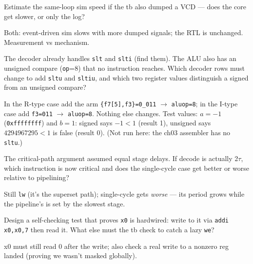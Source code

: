 \begin{exercise}[medium]\label{ex:m05e}
Estimate the same-loop sim speed if the tb also dumped a VCD ---
does the core get slower, or only the log?
\end{exercise}
\begin{solution}[hint]
Both: event-driven sim slows with more dumped signals; the RTL is
unchanged. Measurement vs mechanism.
\end{solution}

\begin{exercise}[hard]\label{ex:h05a}
The decoder already handles \texttt{slt} and \texttt{slti}
(find them). The ALU also has an unsigned compare (\texttt{op}=8) that
no instruction reaches. Which decoder rows must change to add
\texttt{sltu} and \texttt{sltiu}, and which two register values
distinguish a signed from an unsigned compare?
\end{exercise}
\begin{solution}[hint]
In the R-type case add the arm \texttt{\{f7[5],f3\}=0\_011} $\to$
\texttt{aluop=8}; in the I-type case add \texttt{f3=011} $\to$
\texttt{aluop=8}. Nothing else changes. Test values: $a=-1$
(\texttt{0xffffffff}) and $b=1$: signed says $-1<1$ (result 1),
unsigned says $4294967295<1$ is false (result 0). (Not run here: the
ch03 assembler has no \texttt{sltu}.)
\end{solution}

\begin{exercise}[hard]\label{ex:h05b}
The critical-path argument assumed equal stage delays. If decode is
actually 2$\tau$, which instruction is now critical and does the
single-cycle case get better or worse relative to pipelining?
\end{exercise}
\begin{solution}[hint]
Still \texttt{lw} (it's the superset path); single-cycle gets
\emph{worse} --- its period grows while the pipeline's is set by the
slowest stage.
\end{solution}

\begin{exercise}[hard]\label{ex:h05c}
Design a self-checking test that proves \texttt{x0} is hardwired:
write to it via \texttt{addi x0,x0,7} then read it. What else must
the tb check to catch a lazy \texttt{we}?
\end{exercise}
\begin{solution}[hint]
x0 must still read 0 after the write; also check a real write to a
nonzero reg landed (proving we wasn't masked globally).
\end{solution}


